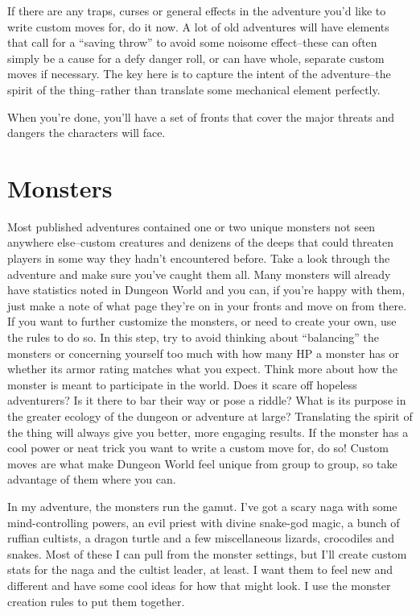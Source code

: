  If there are any traps, curses or general effects in the adventure you'd like to write custom moves for, do it now. A lot of old adventures will have elements that call for a ``saving throw'' to avoid some noisome effect--these can often simply be a cause for a defy danger roll, or can have whole, separate custom moves if necessary. The key here is to capture the intent of the adventure--the spirit of the thing--rather than translate some mechanical element perfectly.


 When you're done, you'll have a set of fronts that cover the major threats and dangers the characters will face.
\section{Monsters}


 Most published adventures contained one or two unique monsters not seen anywhere else--custom creatures and denizens of the deeps that could threaten players in some way they hadn't encountered before. Take a look through the adventure and make sure you've caught them all. Many monsters will already have statistics noted in Dungeon World and you can, if you're happy with them, just make a note of what page they're on in your fronts and move on from there. If you want to further customize the monsters, or need to create your own, use the rules to do so. In this step, try to avoid thinking about ``balancing'' the monsters or concerning yourself too much with how many HP a monster has or whether its armor rating matches what you expect. Think more about how the monster is meant to participate in the world. Does it scare off hopeless adventurers? Is it there to bar their way or pose a riddle? What is its purpose in the greater ecology of the dungeon or adventure at large? Translating the spirit of the thing will always give you better, more engaging results. If the monster has a cool power or neat trick you want to write a custom move for, do so! Custom moves are what make Dungeon World feel unique from group to group, so take advantage of them where you can.


 In my adventure, the monsters run the gamut. I've got a scary naga with some mind-controlling powers, an evil priest with divine snake-god magic, a bunch of ruffian cultists, a dragon turtle and a few miscellaneous lizards, crocodiles and snakes. Most of these I can pull from the monster settings, but I'll create custom stats for the naga and the cultist leader, at least. I want them to feel new and different and have some cool ideas for how that might look. I use the monster creation rules to put them together.
